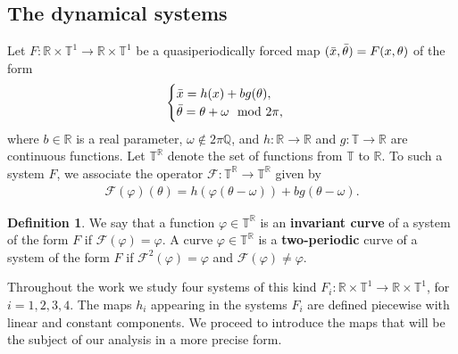 \documentclass[12pt]{article}
\newcommand{\T}{\mathbb{T}}
\newcommand{\R}{\mathbb{R}}
\theoremstyle{plain}
\theoremstyle{remark}
\theoremstyle{definition}
\newtheorem{definition}{Definition}[section]
\begin{document}
\subsection{The dynamical systems}\label{dyn_sys_sect}
Let $F\colon\R\times\T^1\to\R\times\T^1$ be a quasiperiodically forced map $(\Bar{x}, \Bar{\theta})=F(x,\theta)$ of the form
\begin{align*}
    \begin{cases}
        \Bar{x} = h(x) + b g(\theta),\\
        \Bar{\theta} = \theta + \omega \mod2\pi,
    \end{cases}
\end{align*}
where $b\in\R$ is a real parameter, $\omega\not\in2\pi\mathbb{Q}$, and $h\colon\R\to\R$ and $g\colon\T\to\R$ are continuous functions. Let $\T^\R$ denote the set of functions from $\T$ to $\R$. To such a system $F$, we associate the operator $\mathcal{F}\colon\T^\R\to \T^\R$ given by
\begin{align*}
    \mathcal{F}(\varphi)(\theta) = h(\varphi(\theta-\omega)) + b g(\theta-\omega).
\end{align*}
\begin{definition}\label{def_twi_inv}
    We say that a function $\varphi\in\T^\R$ is an \textbf{invariant curve} of a system of the form $F$ if $\mathcal{F}(\varphi)=\varphi$. A curve $\varphi\in\T^\R$ is a \textbf{two-periodic} curve of a system of the form $F$ if $\mathcal{F}^2(\varphi)=\varphi$ and $\mathcal{F}(\varphi)\not=\varphi$.
\end{definition}
Throughout the work we study four systems of this kind $F_i\colon\R\times\T^1\to\R\times\T^1$, for $i=1,2,3,4$. The maps $h_i$ appearing in the systems $F_i$ are defined piecewise with linear and constant components. We proceed to introduce the maps that will be the subject of our analysis in a more precise form.
\end{document}
